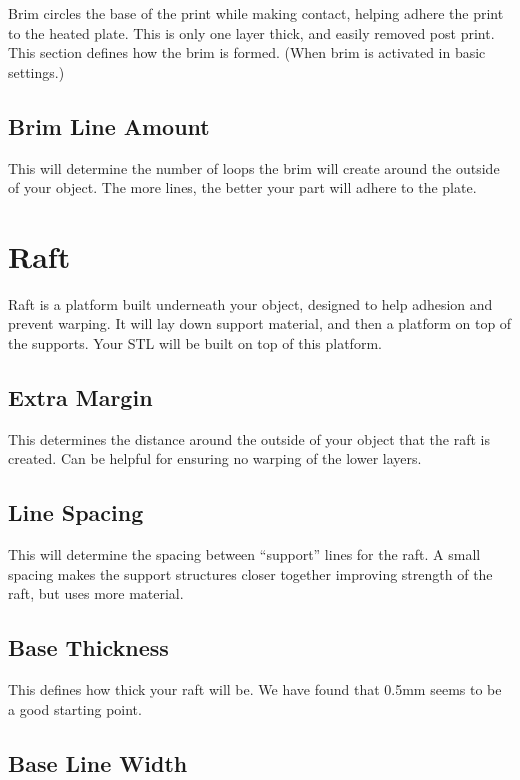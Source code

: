 Brim circles the base of the print while making contact, helping adhere the print to the heated plate. This is only one layer thick, and easily removed post print. This section defines how the brim is formed. (When brim is activated in basic settings.)

\subsection{Brim Line Amount}
This will determine the number of loops the brim will create around the outside of your object. The more lines, the better your part will adhere to the plate. 

\section{Raft}

Raft is a platform built underneath your object, designed to help adhesion and prevent warping. It will lay down support material, and then a platform on top of the supports. Your STL will be built on top of this platform. 

\subsection{Extra Margin}

This determines the distance around the outside of your object that the raft is created. Can be helpful for ensuring no warping of the lower layers.

\subsection{Line Spacing}

This will determine the spacing between “support” lines for the raft. A small spacing makes the support structures closer together improving strength of the raft, but uses more material.

\subsection{Base Thickness}

This defines how thick your raft will be. We have found that 0.5mm seems to be a good starting point.

\subsection{Base Line Width}

